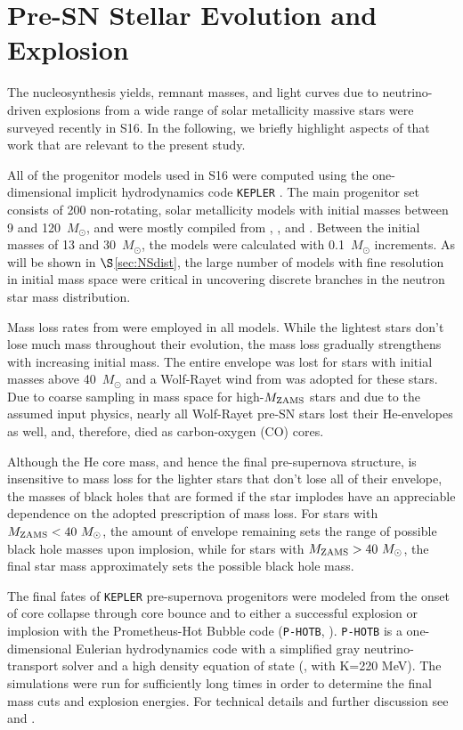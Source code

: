 \documentclass[]{emulateapj}
\newcommand{\Ms}{M_{\odot}}
\newcommand{\Mz}{M_{\rm ZAMS}}
\begin{document}
\section{Pre-SN Stellar Evolution and Explosion}
\label{sec:models}
The nucleosynthesis yields, remnant masses, and light curves due to neutrino-driven explosions from a wide range of solar metallicity massive stars were surveyed recently in S16. In the following, we briefly highlight aspects of that work that are relevant to the present study.

All of the progenitor models used in S16 were computed using the one-dimensional implicit hydrodynamics code \texttt{KEPLER} \citep{Weaver1978}. The main progenitor set consists of 200 non-rotating, solar metallicity models with initial masses between 9 and 120~$\Ms$, and were mostly compiled from \citet{Woosley2007}, \citet{Sukhbold2014}, and \citet{Woosley2015}.  Between the initial masses of 13 and 30~$\Ms$, the models were calculated with 0.1~$\Ms$ increments. As will be shown in $\S$\ref{sec:NSdist}, the large number of models with fine resolution in initial mass space were critical in uncovering discrete branches in the neutron star mass distribution.

Mass loss rates from \citet{Nieuwenhuijzen1990} were employed in all models. While the lightest stars don't lose much mass throughout their evolution, the mass loss gradually strengthens with increasing initial mass. The entire envelope was lost for stars with initial masses above 40~$\Ms$ and a Wolf-Rayet wind from \citet{Wellstein1999} was adopted for these stars. Due to coarse sampling in mass space for high-$\Mz$ stars and due to the assumed input physics, nearly all Wolf-Rayet pre-SN stars lost their He-envelopes as well, and, therefore, died as carbon-oxygen (CO) cores.

Although the He core mass, and hence the final pre-supernova structure, is insensitive to mass loss for the lighter stars that don't lose all of their envelope, the masses of black holes that are formed if the star implodes have an appreciable dependence on the adopted prescription of mass loss. For stars with $\Mz < 40~\Ms$, the amount of envelope remaining sets the range of possible black hole masses upon implosion, while for stars with $\Mz>40~\Ms$, the final star mass approximately sets the possible black hole mass.

The final fates of \texttt{KEPLER} pre-supernova progenitors were modeled from the onset of core collapse through core bounce and to either a successful explosion or implosion with the Prometheus-Hot Bubble code (\texttt{P-HOTB}, \citealt{Janka1996, Kifonidis2003}). \texttt{P-HOTB} is a one-dimensional Eulerian hydrodynamics code with a simplified gray neutrino-transport solver and a high density equation of state (\citealt{Lattimer1991}, with K=220 MeV). The simulations were run for sufficiently long times in order to determine the final mass cuts and explosion energies. For technical details and further discussion see \citet{Ugliano2012} and \citet{Ertl2016}.
\end{document}
